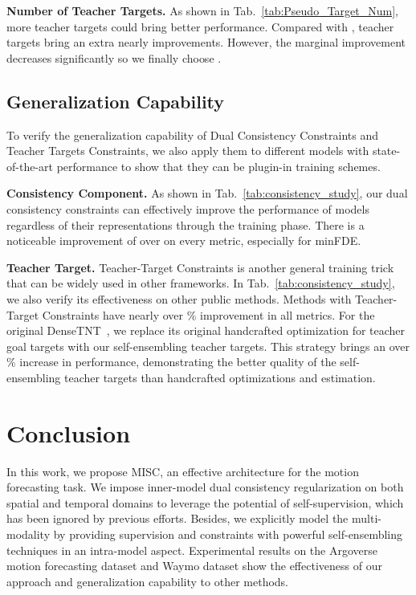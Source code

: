 \documentclass[10pt,twocolumn,letterpaper]{article}
\begin{document}
\noindent\textbf{Number of Teacher Targets.} As shown in Tab.~\ref{tab:Pseudo_Target_Num}, more teacher targets could bring better performance. Compared with ,  teacher targets bring an extra nearly  improvements. However, the marginal improvement decreases significantly so we finally choose .





\subsection{Generalization Capability}
To verify the generalization capability of Dual Consistency Constraints and Teacher Targets Constraints, we also apply them to different models with state-of-the-art performance to show that they can be plugin-in training schemes.

\noindent\textbf{Consistency Component.} 
As shown in Tab.~\ref{tab:consistency_study}, our dual consistency constraints can effectively improve the performance of models regardless of their representations through the training phase. There is a noticeable improvement of over  on every metric, especially for minFDE.





\noindent\textbf{Teacher Target.} Teacher-Target Constraints is another general training trick that can be widely used in other frameworks. In Tab.~\ref{tab:consistency_study}, we also verify its effectiveness on other public methods. Methods with Teacher-Target Constraints have nearly over \% improvement in all metrics. For the original DenseTNT~\cite{gu2021densetnt}, we replace its original handcrafted optimization for teacher goal targets with our self-ensembling teacher targets. This strategy brings an over \%  increase in performance, demonstrating the better quality of the self-ensembling teacher targets than handcrafted optimizations and estimation.






\section{Conclusion}

In this work, we propose MISC, an effective architecture for the motion forecasting task. We impose inner-model dual consistency regularization on both spatial and temporal domains to leverage the potential of self-supervision, which has been ignored by previous efforts. Besides, we explicitly model the multi-modality by providing supervision and constraints with powerful self-ensembling techniques in an intra-model aspect. 
Experimental results on the Argoverse motion forecasting dataset and Waymo dataset show the effectiveness of our approach and generalization capability to other methods.
\end{document}
